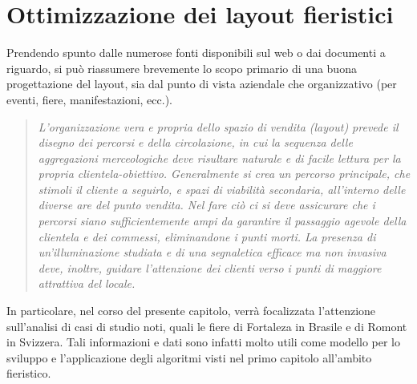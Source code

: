 \documentclass[12pt,a4paper,openright,twoside]{report}
\begin{document}
\chapter{Ottimizzazione dei layout fieristici}                   %
Prendendo spunto dalle numerose fonti disponibili sul web o dai documenti a riguardo, si pu\`{o} riassumere brevemente lo scopo primario di una buona progettazione del layout, sia dal punto di vista aziendale che organizzativo (per eventi, fiere, manifestazioni, ecc.).
\begin{quotation}
\emph{L'organizzazione vera e propria dello spazio di vendita (layout) prevede il disegno dei percorsi e della circolazione, in cui la sequenza delle aggregazioni merceologiche deve risultare naturale e di facile lettura per la propria clientela-obiettivo. Generalmente si crea un percorso principale, che stimoli il cliente a seguirlo, e spazi di viabilit\`{a} secondaria, all'interno delle diverse are del punto vendita. Nel fare ci\`{o} ci si deve assicurare che i percorsi siano sufficientemente ampi da garantire il passaggio agevole della clientela e dei commessi, eliminandone i punti morti. La presenza di un'illuminazione studiata e di una segnaletica efficace ma non invasiva deve, inoltre, guidare l'attenzione dei clienti verso i punti di maggiore attrattiva del locale.}
\end{quotation}
In particolare, nel corso del presente capitolo, verr\`{a} focalizzata l'attenzione sull'analisi di casi di studio noti, quali le fiere di Fortaleza in Brasile e di Romont in Svizzera. Tali informazioni e dati sono infatti molto utili come modello per lo sviluppo e l'applicazione degli algoritmi visti nel primo capitolo all'ambito fieristico.
\end{document}
